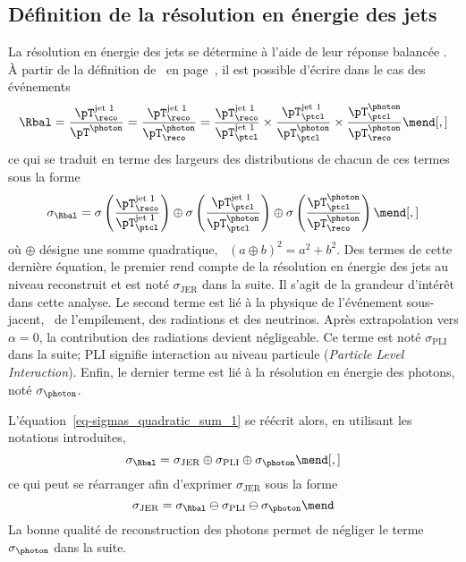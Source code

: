 \subsection{Définition de la résolution en énergie des jets}\label{chapter-JERC-section-JER-subsec-JER_definition}
La résolution en énergie des jets se détermine à l'aide de leur réponse balancée \Rbal.
À partir de la définition de \Rbal\ en page~\pageref{eq-chapter-JERC-section-CMS-subsec-residuals-Rbal_def}, il est possible d'écrire dans le cas des événements \Gjets
\begin{equation}
\Rbal
= \frac{\pT_\reco^\text{jet 1}}{\pT^{\photon}}
= \frac{\pT_\reco^\text{jet 1}}{\pT^{\photon}_\reco}
=
\frac{\pT_\reco^\text{jet 1}}{\pT^\text{jet 1}_\ptcl}
\times
\frac{\pT^\text{jet 1}_\ptcl}{\pT^{\photon}_\ptcl}
\times
\frac{\pT^{\photon}_\ptcl}{\pT^{\photon}_\reco}
\mend[,]
\end{equation}
ce qui se traduit en terme des largeurs des distributions de chacun de ces termes sous la forme
\begin{equation}
\sigma_{\Rbal}
=
\sigma\left(\frac{\pT_\reco^\text{jet 1}}{\pT^\text{jet 1}_\ptcl}\right)
\oplus
\sigma\left(\frac{\pT^\text{jet 1}_\ptcl}{\pT^{\photon}_\ptcl}\right)
\oplus
\sigma\left(\frac{\pT^{\photon}_\ptcl}{\pT^{\photon}_\reco} \vphantom{\frac{\pT^\text{jet 1}_\ptcl}{\pT^{\photon}_\ptcl}}\right)
\label{eq-sigmas_quadratic_sum_1}
\mend[,]
\end{equation}
où $\oplus$ désigne une somme quadratique, \ie\ $(a\oplus b)^2 = a^2 + b^2$.
Des termes de cette dernière équation, le premier rend compte de la résolution en énergie des jets au niveau reconstruit et est noté $\sigma_\text{JER}$ dans la suite.
Il s'agit de la grandeur d'intérêt dans cette analyse.
Le second terme est lié à la physique de l'événement sous-jacent, \ie\ de l'empilement, des radiations et des neutrinos.
Après extrapolation vers $\alpha=0$, la contribution des radiations devient négligeable.
Ce terme est noté $\sigma_\text{PLI}$ dans la suite; \og PLI \fg{} signifie interaction au niveau particule (\emph{Particle Level Interaction}).
Enfin, le dernier terme est lié à la résolution en énergie des photons, noté $\sigma_{\photon}$.
\par L'équation~\eqref{eq-sigmas_quadratic_sum_1} se réécrit alors, en utilisant les notations introduites,
\begin{equation}
\sigma_{\Rbal}
=
\sigma_\text{JER}
\oplus
\sigma_\text{PLI}
\oplus
\sigma_{\photon}
\label{eq-sigmas_quadratic_sum_2}
\mend[,]
\end{equation}
ce qui peut se réarranger afin d'exprimer $\sigma_\text{JER}$ sous la forme
\begin{equation}
\sigma_\text{JER}
=
\sigma_{\Rbal}
\ominus
\sigma_\text{PLI}
\ominus
\sigma_{\photon}
\label{eq-sigmas_quadratic_sum_3}
\mend
\end{equation}
La bonne qualité de reconstruction des photons permet de négliger le terme $\sigma_{\photon}$ dans la suite.
